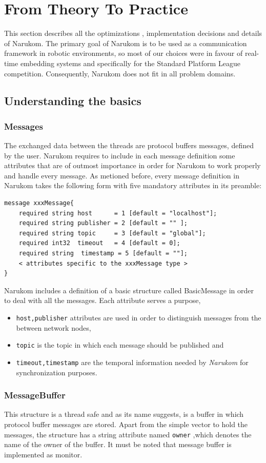 \chapter{From Theory To Practice}
\label{implementation}

This section describes all the optimizations , implementation decisions and details of Narukom. The primary goal of Narukom is to be used as a communication
framework in robotic environments, so most of our choices were in favour of real-time embedding systems and specifically for the Standard Platform League
competition. Consequently, Narukom does not fit in all problem domains.
\section{Understanding the basics}
\subsection{Messages}
The exchanged data between the threads are protocol buffers messages, defined by the user. Narukom requires to include in each message definition some attributes that are of outmost importance in order for Narukom to work properly and handle every message. As metioned before, every message definition in Narukom takes the following form with five mandatory attributes in its preamble: 
\begin{verbatim}
message xxxMessage{
    required string host      = 1 [default = "localhost"];
    required string publisher = 2 [default = "" ];
    required string topic     = 3 [default = "global"];
    required int32  timeout   = 4 [default = 0];
    required string  timestamp = 5 [default = ""];
    < attributes specific to the xxxMessage type >
}
\end{verbatim} 
Narukom includes a definition of a basic structure called BasicMessage in order to deal with all the messages. Each attribute serves a purpose,
\begin{itemize}
\item {\tt host,publisher} attributes are used in order to distinguish messages from the between network nodes,
\item {\tt topic} is the topic in which each message should be published and
\item {\tt timeout,timestamp} are the temporal information needed by \textit{Narukom} for synchronization purposes.
\end{itemize}

\subsection{MessageBuffer}
This structure is a thread safe and as its name suggests, is a buffer in which protocol buffer messages are stored. Apart from the simple vector to hold the messages, the structure has a string attribute named {\tt owner} ,which denotes the name of the owner of the buffer. It must be noted that message buffer is implemented as monitor.

